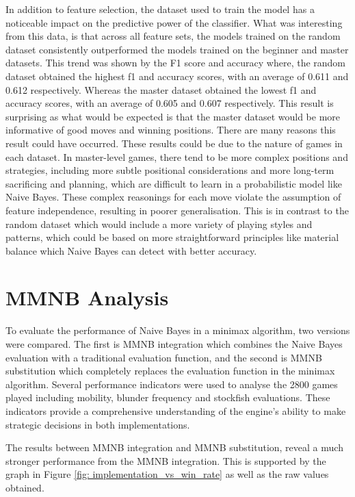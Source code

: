 In addition to feature selection, the dataset used to train the model has a noticeable impact on the predictive power of the classifier. What was interesting from this data, is that across all feature sets, the models trained on the random dataset consistently outperformed the models trained on the beginner and master datasets. This trend was shown by the F1 score and accuracy where, the random dataset obtained the highest f1 and accuracy scores, with an average of 0.611 and 0.612 respectively. Whereas the master dataset obtained the lowest f1 and accuracy scores, with an average of 0.605 and 0.607 respectively. This result is surprising as what would be expected is that the master dataset would be more informative of good moves and winning positions. There are many reasons this result could have occurred. These results could be due to the nature of games in each dataset. In master-level games, there tend to be more complex positions and strategies, including more subtle positional considerations and more long-term sacrificing and planning, which are difficult to learn in a probabilistic model like Naive Bayes. These complex reasonings for each move violate the assumption of feature independence, resulting in poorer generalisation. This is in contrast to the random dataset which would include a more variety of playing styles and patterns, which could be based on more straightforward principles like material balance which Naive Bayes can detect with better accuracy.


\section{MMNB Analysis}

To evaluate the performance of Naive Bayes in a minimax algorithm, two versions were compared. The first is MMNB integration which combines the Naive Bayes evaluation with a traditional evaluation function, and the second is MMNB substitution which completely replaces the evaluation function in the minimax algorithm. Several performance indicators were used to analyse the 2800 games played including mobility, blunder frequency and stockfish evaluations. These indicators provide a comprehensive understanding of the engine's ability to make strategic decisions in both implementations.


The results between MMNB integration and MMNB substitution, reveal a much stronger performance from the MMNB integration. This is supported by the graph in Figure \ref{fig: implementation_vs_win_rate} as well as the raw values obtained.


